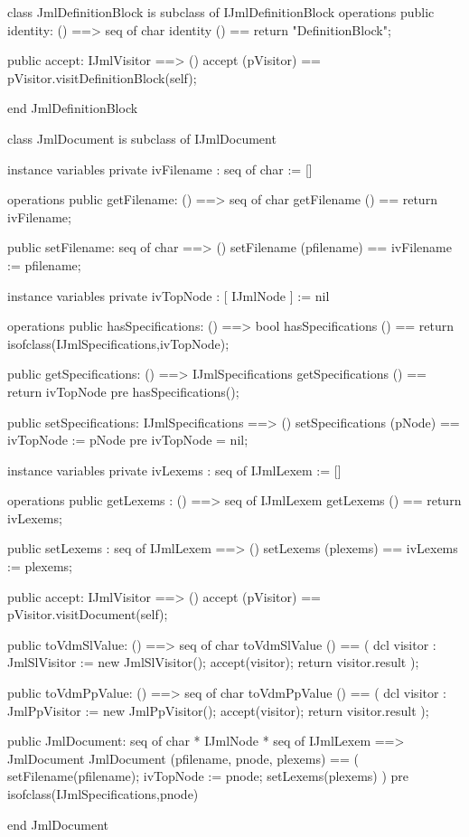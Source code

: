 \begin{vdm_al}
class JmlDefinitionBlock is subclass of IJmlDefinitionBlock
operations
  public identity: () ==> seq of char
  identity () == return "DefinitionBlock";

  public accept: IJmlVisitor ==> ()
  accept (pVisitor) == pVisitor.visitDefinitionBlock(self);

end JmlDefinitionBlock
\end{vdm_al}
\begin{vdm_al}
class JmlDocument is subclass of IJmlDocument

instance variables
  private ivFilename : seq of char := []

operations
  public getFilename: () ==> seq of char
  getFilename () == return ivFilename;

  public setFilename: seq of char ==> ()
  setFilename (pfilename) == ivFilename := pfilename;

instance variables
  private ivTopNode : [ IJmlNode ] := nil

operations
  public hasSpecifications: () ==> bool
  hasSpecifications () == return isofclass(IJmlSpecifications,ivTopNode);

  public getSpecifications: () ==> IJmlSpecifications
  getSpecifications () == return ivTopNode
    pre hasSpecifications();

  public setSpecifications: IJmlSpecifications ==> ()
  setSpecifications (pNode) == ivTopNode := pNode
    pre ivTopNode = nil;

instance variables
  private ivLexems : seq of IJmlLexem := []

operations
  public getLexems : () ==> seq of IJmlLexem
  getLexems () == return ivLexems;

  public setLexems : seq of IJmlLexem ==> ()
  setLexems (plexems) == ivLexems := plexems;

  public accept: IJmlVisitor ==> ()
  accept (pVisitor) == pVisitor.visitDocument(self);

  public toVdmSlValue: () ==> seq of char
  toVdmSlValue () ==
    ( dcl visitor : JmlSlVisitor := new JmlSlVisitor();
      accept(visitor);
      return visitor.result );

  public toVdmPpValue: () ==> seq of char
  toVdmPpValue () ==
    ( dcl visitor : JmlPpVisitor := new JmlPpVisitor();
      accept(visitor);
      return visitor.result );

  public JmlDocument: seq of char * IJmlNode * seq of IJmlLexem ==> JmlDocument
  JmlDocument (pfilename, pnode, plexems) ==
    ( setFilename(pfilename);
      ivTopNode := pnode;
      setLexems(plexems) )
    pre isofclass(IJmlSpecifications,pnode)

end JmlDocument
\end{vdm_al}
